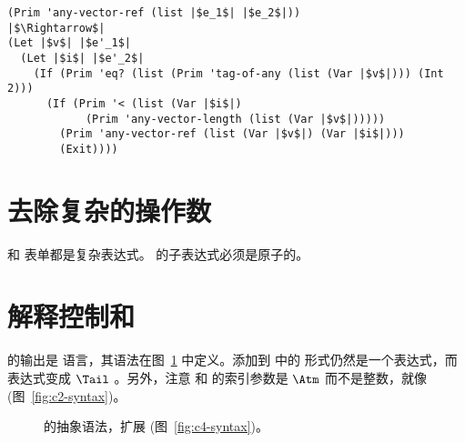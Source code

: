 \documentclass[11pt]{book}
\newcommand{\gray}[1]{{\color{gray} #1}}
\begin{document}
\begin{lstlisting}
(Prim 'any-vector-ref (list |$e_1$| |$e_2$|))
|$\Rightarrow$|
(Let |$v$| |$e'_1$|
  (Let |$i$| |$e'_2$|
    (If (Prim 'eq? (list (Prim 'tag-of-any (list (Var |$v$|))) (Int 2)))
      (If (Prim '< (list (Var |$i$|)
            (Prim 'any-vector-length (list (Var |$v$|)))))
        (Prim 'any-vector-ref (list (Var |$v$|) (Var |$i$|)))
        (Exit))))
\end{lstlisting}

\section{去除复杂的操作数}
\label{sec:rco-Rany}

  和  表单都是复杂表达式。  的子表达式必须是原子的。
\section{解释控制和 \LangCAny{}}
\label{sec:explicate-Rany}

  的输出是 \LangCAny{} 语言，其语法在图~\ref{fig:c5-syntax} 中定义。添加到 \LangAny{} 中的 
形式仍然是一个表达式，而  表达式变成 $\Tail$ 。另外，注意
 和  的索引参数是 $\Atm$ 而不是整数，就像 \LangCVec{} (图~\ref{fig:c2-syntax})。


\begin{figure}[tp]
\fbox{
\begin{minipage}{0.96\textwidth}
\small
\[
\begin{array}{lcl}
\Exp &::= & \ldots
   \mid \BINOP{\key{'any-vector-ref}}{\Atm}{\Atm}  \\
   &\mid& (\key{Prim}~\key{'any-vector-set!}\,(\key{list}\,\Atm\,\Atm\,\Atm))\\
   &\mid& \VALUEOF{\Exp}{\FType} \\
\Stmt &::=& \gray{ \ASSIGN{\VAR{\Var}}{\Exp} 
  \mid \LP\key{Collect} \,\itm{int}\RP }\\
\Tail &::= & \gray{ \RETURN{\Exp} \mid \SEQ{\Stmt}{\Tail} 
       \mid \GOTO{\itm{label}} } \\
    &\mid& \gray{ \IFSTMT{\BINOP{\itm{cmp}}{\Atm}{\Atm}}{\GOTO{\itm{label}}}{\GOTO{\itm{label}}}  }\\
&\mid& \gray{ \TAILCALL{\Atm}{\Atm\ldots} } 
  \mid \LP\key{Exit}\RP \\
\Def &::=& \gray{ \DEF{\itm{label}}{\LP[\Var\key{:}\Type]\ldots\RP}{\Type}{\itm{info}}{\LP\LP\itm{label}\,\key{.}\,\Tail\RP\ldots\RP} }\\
\LangCLam{} & ::= & \gray{ \PROGRAMDEFS{\itm{info}}{\LP\Def\ldots\RP} }
\end{array}
\]
\end{minipage}
}
\caption{ \LangCAny{} 的抽象语法，扩展 \LangCLam{} (图~\ref{fig:c4-syntax})。}
\label{fig:c5-syntax}
\end{figure}
\end{document}
